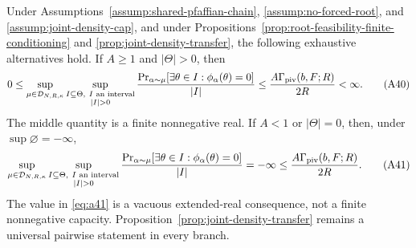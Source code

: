 \begin{proposition}
\label{prop:ordered-suprema}
Under Assumptions~\ref{assump:shared-pfaffian-chain},
\ref{assump:no-forced-root}, and \ref{assump:joint-density-cap}, and under
Propositions~\ref{prop:root-feasibility-finite-conditioning} and
\ref{prop:joint-density-transfer}, the following exhaustive alternatives
hold.  If $A\geq1$ and $|\Theta|>0$, then
\[
0\leq
\sup_{\mu\in\mathcal D_{N,R,\kappa}}
\sup_{\substack{I\subseteq\Theta,\ I\text{ an interval}\\|I|>0}}
\frac{\Pr_{\alpha\sim\mu}[\exists\theta\in I:
\phi_\alpha(\theta)=0]}{|I|}
\leq\frac{A\Gamma_{\rm piv}(b,F;R)}{2R}<\infty.
\tag{A40}\label{eq:a40}
\]
The middle quantity is a finite nonnegative real.  If $A<1$ or
$|\Theta|=0$, then, under $\sup\varnothing=-\infty$,
\[
\sup_{\mu\in\mathcal D_{N,R,\kappa}}
\sup_{\substack{I\subseteq\Theta,\ I\text{ an interval}\\|I|>0}}
\frac{\Pr_{\alpha\sim\mu}[\exists\theta\in I:
\phi_\alpha(\theta)=0]}{|I|}
=-\infty
\leq\frac{A\Gamma_{\rm piv}(b,F;R)}{2R}.
\tag{A41}\label{eq:a41}
\]
The value in \eqref{eq:a41} is a vacuous extended-real consequence, not a
finite nonnegative capacity.  Proposition~\ref{prop:joint-density-transfer}
remains a universal pairwise statement in every branch.
\end{proposition}

